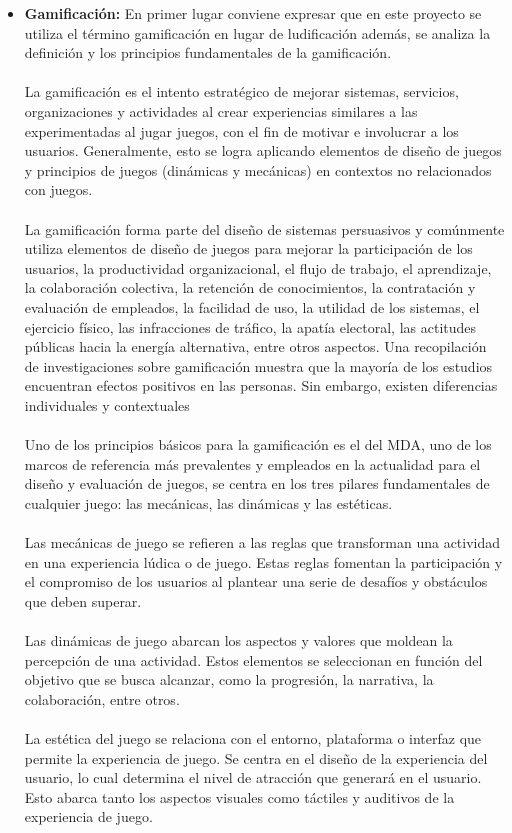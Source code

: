 \begin{itemize}
    \item \textbf{Gamificación:} En primer lugar conviene expresar que en este proyecto  se utiliza el término gamificación en lugar de ludificación además, se analiza la definición y los principios fundamentales de la gamificación.
    \\ \\
La gamificación es el intento estratégico de mejorar sistemas, servicios, organizaciones y actividades al crear experiencias similares a las experimentadas al jugar juegos, con el fin de motivar e involucrar a los usuarios. Generalmente, esto se logra aplicando elementos de diseño de juegos y principios de juegos (dinámicas y mecánicas) en contextos no relacionados con juegos.\cite{g}
\\ \\
La gamificación forma parte del diseño de sistemas persuasivos y comúnmente utiliza elementos de diseño de juegos para mejorar la participación de los usuarios, la productividad organizacional, el flujo de trabajo, el aprendizaje, la colaboración colectiva, la retención de conocimientos, la contratación y evaluación de empleados, la facilidad de uso, la utilidad de los sistemas, el ejercicio físico, las infracciones de tráfico, la apatía electoral, las actitudes públicas hacia la energía alternativa, entre otros aspectos. Una recopilación de investigaciones sobre gamificación muestra que la mayoría de los estudios encuentran efectos positivos en las personas. Sin embargo, existen diferencias individuales y contextuales
\\ \\
Uno de los principios básicos para la gamificación es el del MDA, uno de los marcos de referencia más prevalentes y empleados en la actualidad para el diseño y evaluación de juegos, se centra en los tres pilares fundamentales de cualquier juego: las mecánicas, las dinámicas y las estéticas.
\\ \\
Las mecánicas de juego se refieren a las reglas que transforman una actividad en una experiencia lúdica o de juego. Estas reglas fomentan la participación y el compromiso de los usuarios al plantear una serie de desafíos y obstáculos que deben superar.
\\ \\
Las dinámicas de juego abarcan los aspectos y valores que moldean la percepción de una actividad. Estos elementos se seleccionan en función del objetivo que se busca alcanzar, como la progresión, la narrativa, la colaboración, entre otros.
\\ \\
La estética del juego se relaciona con el entorno, plataforma o interfaz que permite la experiencia de juego. Se centra en el diseño de la experiencia del usuario, lo cual determina el nivel de atracción que generará en el usuario. Esto abarca tanto los aspectos visuales como táctiles y auditivos de la experiencia de juego.


\end{itemize}
